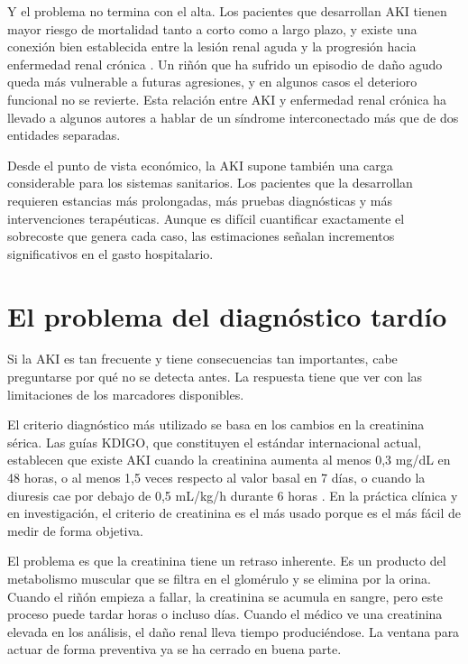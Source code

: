 \documentclass[12pt, a4paper, oneside]{report}
\begin{document}
Y el problema no termina con el alta. Los pacientes que desarrollan AKI tienen mayor riesgo de mortalidad tanto a corto como a largo plazo, y existe una conexión bien establecida entre la lesión renal aguda y la progresión hacia enfermedad renal crónica \parencite{chawla2014akickd}. Un riñón que ha sufrido un episodio de daño agudo queda más vulnerable a futuras agresiones, y en algunos casos el deterioro funcional no se revierte. Esta relación entre AKI y enfermedad renal crónica ha llevado a algunos autores a hablar de un síndrome interconectado más que de dos entidades separadas.

Desde el punto de vista económico, la AKI supone también una carga considerable para los sistemas sanitarios. Los pacientes que la desarrollan requieren estancias más prolongadas, más pruebas diagnósticas y más intervenciones terapéuticas. Aunque es difícil cuantificar exactamente el sobrecoste que genera cada caso, las estimaciones señalan incrementos significativos en el gasto hospitalario.

\section{El problema del diagnóstico tardío}

Si la AKI es tan frecuente y tiene consecuencias tan importantes, cabe preguntarse por qué no se detecta antes. La respuesta tiene que ver con las limitaciones de los marcadores disponibles.

El criterio diagnóstico más utilizado se basa en los cambios en la creatinina sérica. Las guías KDIGO, que constituyen el estándar internacional actual, establecen que existe AKI cuando la creatinina aumenta al menos 0,3 mg/dL en 48 horas, o al menos 1,5 veces respecto al valor basal en 7 días, o cuando la diuresis cae por debajo de 0,5 mL/kg/h durante 6 horas \parencite{kdigo2012aki}. En la práctica clínica y en investigación, el criterio de creatinina es el más usado porque es el más fácil de medir de forma objetiva.

El problema es que la creatinina tiene un retraso inherente. Es un producto del metabolismo muscular que se filtra en el glomérulo y se elimina por la orina. Cuando el riñón empieza a fallar, la creatinina se acumula en sangre, pero este proceso puede tardar horas o incluso días. Cuando el médico ve una creatinina elevada en los análisis, el daño renal lleva tiempo produciéndose. La ventana para actuar de forma preventiva ya se ha cerrado en buena parte.
\end{document}
